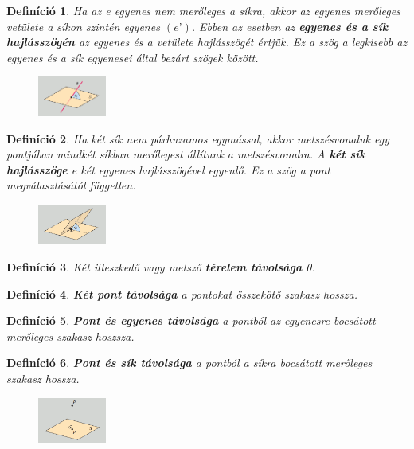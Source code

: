 \documentclass[12pt,a4paper]{article}
\newtheorem{definition}{Definíció} [section]
\begin{document}
\begin{definition}
 Ha az e egyenes nem merőleges a síkra, akkor az egyenes merőleges vetülete a síkon szintén egyenes $(e’)$. Ebben az esetben az \textbf{egyenes és a sík hajlásszögén} az egyenes és a vetülete hajlásszögét értjük. Ez a szög a legkisebb az egyenes és a sík egyenesei által bezárt szögek között.
 \begin{figure}[h]
\centering
\includegraphics[width=0.2\textwidth]{egyenes_sik_hajlasszog}
\end{figure}
\end{definition}
\newpage
\begin{definition}
Ha két sík nem párhuzamos egymással, akkor metszésvonaluk egy pontjában mindkét síkban merőlegest állítunk a metszésvonalra. A \textbf{két sík hajlásszöge} e két egyenes hajlásszögével egyenlő. Ez a szög a pont megválasztásától független.
\begin{figure}[h]
\centering
\includegraphics[width=0.2\textwidth]{sikok_hajlasszoge}
\end{figure}
\end{definition}
\begin{definition}
Két illeszkedő vagy metsző \textbf{térelem távolsága} 0.
\end{definition}
\begin{definition}
\textbf{Két pont távolsága} a pontokat összekötő szakasz hossza.
\end{definition}
\begin{definition}
\textbf{Pont és egyenes távolsága} a pontból az egyenesre bocsátott merőleges szakasz hoszsza.
\end{definition}
\begin{definition}
\textbf{Pont és sík távolsága} a pontból a síkra bocsátott merőleges szakasz hossza.
\begin{figure}[h]
\centering
\includegraphics[width=0.2\textwidth]{pont_sik_tavolsag}
\end{figure}
\end{definition}
\end{document}
